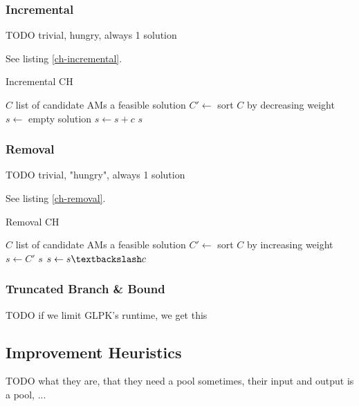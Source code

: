 \documentclass[a4paper,12pt,oneside]{report}
\begin{document}
\subsubsection{Incremental}

TODO trivial, hungry, always 1 solution

See listing \ref{ch-incremental}.

\begin{algorithm}
\caption{Incremental CH}
\label{ch-incremental}
\begin{algorithmic}
\REQUIRE $C$ list of candidate AMs
\ENSURE a feasible solution
\STATE $C' \gets $ sort $C$ by decreasing weight
\STATE $s \gets $ empty solution
\STATE $s \gets s + c$
\ENDIF
\ENDFOR
\RETURN $s$
\end{algorithmic}
\end{algorithm}

\subsubsection{Removal}

TODO trivial, "hungry", always 1 solution

See listing \ref{ch-removal}.

\begin{algorithm}
\caption{Removal CH}
\label{ch-removal}
\begin{algorithmic}
\REQUIRE $C$ list of candidate AMs
\ENSURE a feasible solution
\STATE $C' \gets $ sort $C$ by increasing weight
\STATE $s \gets C'$
    \RETURN $s$
  \ENDIF
  \STATE $s \gets s \textbackslash c$
\ENDFOR
\end{algorithmic}
\end{algorithm}

\subsubsection{Truncated Branch \& Bound}

TODO if we limit GLPK's runtime, we get this 

\subsection{Improvement Heuristics}


TODO what they are, that they need a pool sometimes, their input and output is a pool, ...
\end{document}
